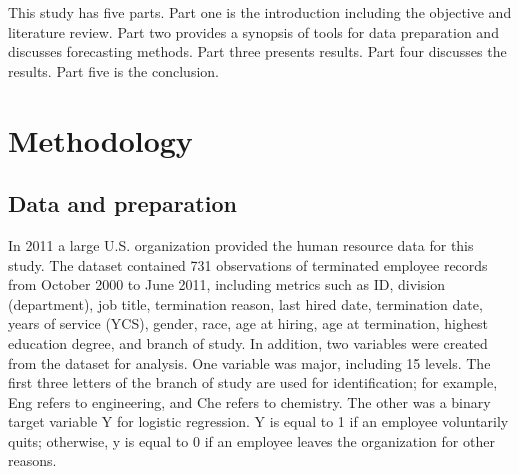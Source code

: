 This study has five parts. Part one is the introduction including the objective and literature review. Part two provides a synopsis of tools for data preparation and discusses forecasting methods. Part three presents results. Part four discusses the results. Part five is the conclusion. 
\section{Methodology}
\subsection{Data and preparation}
In 2011 a large U.S. organization provided the human resource data for this study. The dataset contained 731 observations of terminated employee records from October 2000 to June 2011, including metrics such as ID, division (department), job title, termination reason, last hired date, termination date, years of service (YCS), gender, race, age at hiring, age at termination, highest education degree, and branch of study. 
In addition, two variables were created from the dataset for analysis. One variable was major, including 15 levels. The first three letters of the branch of study are used for identification; for example, Eng refers to engineering, and Che refers to chemistry. The other was a binary target variable Y for logistic regression. Y is equal to 1 if an employee voluntarily quits; otherwise, y is equal to 0 if an employee leaves the organization for other reasons.
